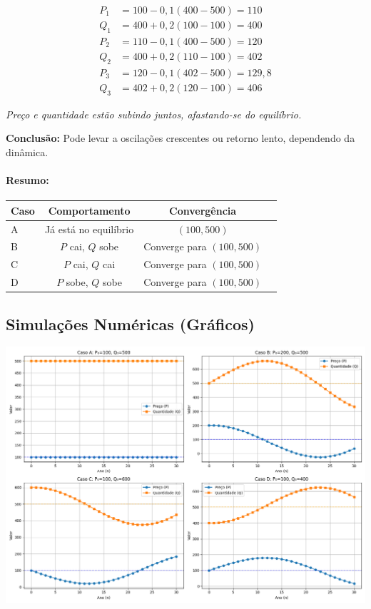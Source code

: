 \documentclass{article}
\begin{document}
\[
\begin{aligned}
P_1 &= 100 - 0{,}1(400 - 500) = 110 \\
Q_1 &= 400 + 0{,}2(100 - 100) = 400 \\
P_2 &= 110 - 0{,}1(400 - 500) = 120 \\
Q_2 &= 400 + 0{,}2(110 - 100) = 402 \\
P_3 &= 120 - 0{,}1(402 - 500) = 129{,}8 \\
Q_3 &= 402 + 0{,}2(120 - 100) = 406
\end{aligned}
\]

\textit{Preço e quantidade estão subindo juntos, afastando-se do equilíbrio.}

\textbf{Conclusão:} Pode levar a oscilações crescentes ou retorno lento, dependendo da dinâmica.


\paragraph{Resumo:}

\begin{center}
\begin{tabular}{lccc}
\toprule
\textbf{Caso} & \textbf{Comportamento} & \textbf{Convergência} \\
\midrule
A & Já está no equilíbrio & $(100,500)$ \\
B & $P$ cai, $Q$ sobe & Converge para $(100,500)$ \\
C & $P$ cai, $Q$ cai & Converge para $(100,500)$ \\
D & $P$ sobe, $Q$ sobe & Converge para $(100,500)$ \\
\bottomrule
\end{tabular}
\end{center}



\subsection*{Simulações Numéricas (Gráficos)}

\begin{center}
\includegraphics[width=0.9\linewidth]{simulacao.png}
\end{center}
\end{document}
